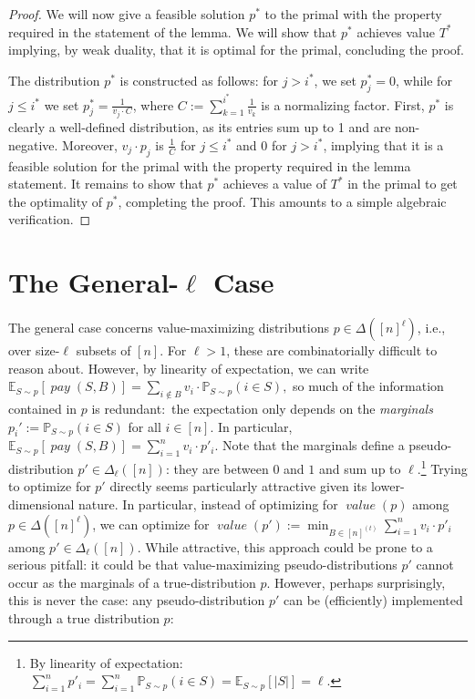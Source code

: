 \documentclass[sigconf,nonacm]{aamas}
\DeclareMathOperator{\payText}{\textit{pay}}
\newcommand{\pay}[1]{\payText({#1})}
\DeclareMathOperator{\valueText}{\textit{value}}
\newcommand{\val}[1]{\valueText({#1})}
\begin{document}
\begin{proof}
We will now give a feasible solution $p^*$ to the primal with the property required in the statement of the lemma. We will show that $p^*$ achieves value $T^*$ implying, by weak duality, that it is optimal for the primal, concluding the proof.

The distribution $p^*$ is constructed as follows: for $j > i^*$, we set $p^*_j = 0$, while for $j \leq i^*$ we set $p^*_j = \frac{1}{v_j \cdot C}$, where $C := \sum_{k = 1}^{i^*}\frac{1}{v_k}$ is a normalizing factor. First, $p^*$ is clearly a well-defined distribution, as its entries sum up to 1 and are non-negative. Moreover, $v_j \cdot p_j$ is $\frac{1}{C}$ for $j \leq i^*$ and $0$ for $j > i^*$, implying that it is a feasible solution for the primal with the property required in the lemma statement. It remains to show that $p^*$ achieves a value of $T^*$ in the primal to get the optimality of $p^*$, completing the proof. This amounts to a simple algebraic verification.
\end{proof}

\section{The General-$\ell$ Case}\label{sect:ell-general}

The general case concerns value-maximizing distributions $p \in \Delta([n]^\ell)$, i.e., over size-$\ell$ subsets of $[n]$. 
For $\ell > 1$, these are combinatorially difficult to reason about. However, by linearity of expectation, we can write $\mathbb{E}_{S \sim p}[\pay{S, B}] = \sum_{i \notin B}v_i \cdot \mathbb{P}_{S \sim p}(i \in S),$ so much of the information contained in $p$ is redundant:~the expectation only depends on the \emph{marginals} $p_i' := \mathbb{P}_{S \sim p}(i \in S)$ for all $i \in [n].$ In particular, $\mathbb{E}_{S \sim p}[\pay{S, B}] = \sum_{i = 1}^{n}v_i \cdot p'_i$. Note that the marginals define a pseudo-distribution $p' \in \Delta_\ell([n])$: they are between $0$ and $1$ and sum up to $\ell$.\footnote{By linearity of expectation: $\sum_{i = 1}^{n}p'_i = \sum_{i = 1}^{n}\mathbb{P}_{S \sim p}(i \in S) = 
\mathbb{E}_{S \sim p}[|S|] = \ell$.} Trying to optimize for $p'$ directly seems particularly attractive given its lower-dimensional nature. In particular, instead of optimizing for $\val{p}$ among $p \in \Delta([n]^\ell)$, we can optimize for $\val{p'} := \min_{B \in [n]^{(t)}}\sum_{i = 1}^{n}v_i \cdot p'_i$ among $p' \in \Delta_\ell([n])$. While attractive, this approach could be prone to a serious pitfall: it could be that value-maximizing pseudo-distributions $p'$ cannot occur as the marginals of a true-distribution $p$. However, perhaps surprisingly, this is never the case: any pseudo-distribution $p'$  can be (efficiently) implemented through a true distribution $p$:
\end{document}
